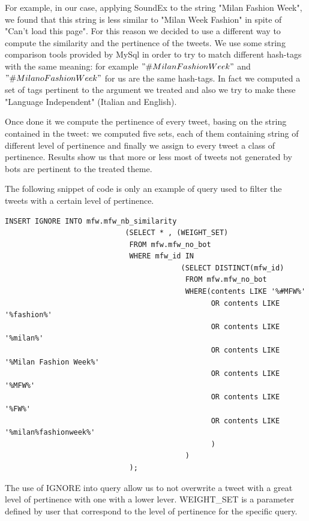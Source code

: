 \documentclass[conference, onecolumn]{IEEEtran}
\begin{document}
For example, in our case, applying SoundEx to the string "Milan Fashion Week", we found that this string is less similar to "Milan Week Fashion" in spite of "Can't load this page".
For this reason we decided to use a different way to compute the similarity and the pertinence of the tweets. We use some string comparison tools provided by MySql in order to try to match different hash-tags with the same meaning: for example $"\# MilanFashionWeek"$ and $"\# MilanoFashionWeek"$ for us are the same hash-tags. In fact we computed a set of tags pertinent to the argument we treated and also we try to make these "Language Independent" (Italian and English).
\medskip

Once done it we compute the pertinence of every tweet, basing on the string contained in the tweet: we computed five sets, each of them containing string of different level of pertinence and finally we assign to every tweet a class of pertinence.
Results show us that more or less most of tweets not generated by bots are pertinent to the treated theme.
\medskip

The following snippet of code is only an example of query used to filter the tweets with a certain level of pertinence.
\begin{lstlisting}
INSERT IGNORE INTO mfw.mfw_nb_similarity
							(SELECT * , (WEIGHT_SET)
							 FROM mfw.mfw_no_bot
							 WHERE mfw_id IN
										 (SELECT DISTINCT(mfw_id)
										  FROM mfw.mfw_no_bot
										  WHERE(contents LIKE '%#MFW%'
												OR contents LIKE '%fashion%'
												OR contents LIKE '%milan%'
												OR contents LIKE '%Milan Fashion Week%'
												OR contents LIKE '%MFW%'
												OR contents LIKE '%FW%'
												OR contents LIKE '%milan%fashionweek%'
											    )
										  )
							 );
\end{lstlisting}
 The use of IGNORE into query allow us to not overwrite a tweet with a great level of pertinence with one with a lower lever. WEIGHT\_SET is a parameter defined by user that correspond to the level of pertinence for the specific query.
\end{document}
